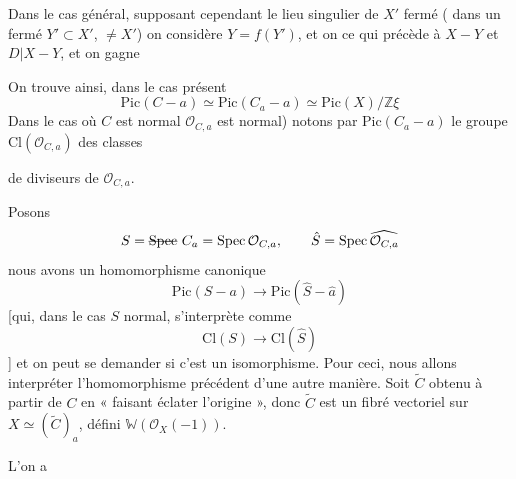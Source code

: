 \documentclass[11pt,a4paper]{article}
\begin{document}
Dans le cas général, supposant cependant le lieu singulier de $X'$ fermé
(  dans un \struck{\ill{}} fermé
\struck{\ill{}} $Y' \subset X'$, $\neq X'$) on considère $Y = f(Y')$, et on
 ce qui précède à $X - Y$ et $D|X - Y$, et on gagne \ill{}

On trouve ainsi, dans le cas présent
\[
  \boxed{\mathrm{Pic}(C - a) \simeq \mathrm{Pic}(C_a - a) \simeq \mathrm{Pic}(X)/\mathbb{Z}\xi}
\]
Dans le cas où $C$ est normal \ill{} \struck{\ill{}} $\mathcal{O}_{C,a}$ est
normal) notons par $\mathrm{Pic}(C_a - a)$  le groupe
$\mathrm{Cl}(\mathcal{O}_{C,a})$ des classes

de diviseurs de $\mathcal{O}_{C,a}$.

Posons
\[
  S = \text{\struck{$\mathrm{Spec}$}}\ C_a = \mathrm{Spec}\, \mathcal{O}_{C,a}, \qquad
  \hat{S} = \mathrm{Spec}\, \widehat{\mathcal{O}_{C,a}}
\]
nous avons un homomorphisme canonique
\[
  \mathrm{Pic}(S - a) \longrightarrow \mathrm{Pic}(\hat{S} - \hat{a})
\]
[qui, dans le cas $S$ normal, s'interprète comme
\[
  \mathrm{Cl}(S) \longrightarrow \mathrm{Cl}(\hat{S})
\]
]
et on peut se demander si c'est un isomorphisme.  Pour ceci,
nous allons interpréter l'homomorphisme précédent d'une autre manière. Soit
$\tilde{C}$ obtenu à partir de $C$ en « faisant éclater l'origine », donc
$\tilde{C}$ est un fibré vectoriel sur $X \simeq (\tilde{C})_a$, défini
\struck{\ill{}}  $\mathbb{W}(\mathcal{O}_X(-1))$.

L'on a \struck{\ill{}}



\end{document}
